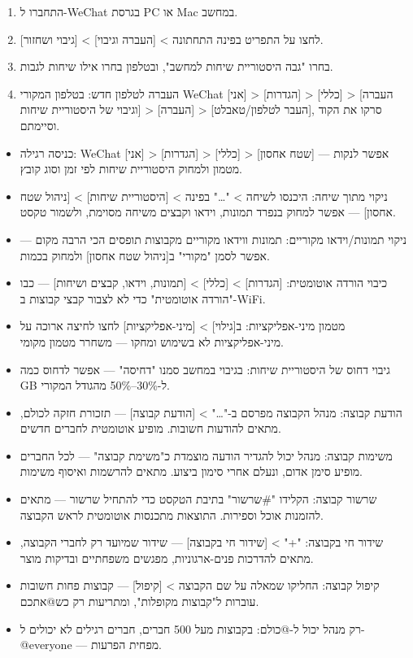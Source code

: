\begin{enumerate}
  \item התחברו ל-WeChat בגרסת PC או Mac במחשב.
  \item לחצו על התפריט בפינה התחתונה > [העברה וגיבוי] > [גיבוי ושחזור].
  \item בחרו "גבה היסטוריית שיחות למחשב", ובטלפון בחרו אילו שיחות לגבות.
  \item העברה לטלפון חדש: בטלפון המקורי WeChat [אני] > [הגדרות] > [כללי] > [העברה וגיבוי של היסטוריית שיחות] > [העברה] > [העבר לטלפון/טאבלט], סרקו את הקוד וסיימתם.
\end{enumerate}


\begin{itemize}
  \item כניסה רגילה: WeChat [אני] > [הגדרות] > [כללי] > [שטח אחסון] — אפשר לנקות מטמון ולמחוק היסטוריית שיחות לפי זמן וסוג קובץ.
  \item ניקוי מתוך שיחה: היכנסו לשיחה > "…" בפינה > [היסטוריית שיחות] > [ניהול שטח אחסון] — אפשר למחוק בנפרד תמונות, וידאו וקבצים משיחה מסוימת, ולשמור טקסט.
  \item ניקוי תמונות/וידאו מקוריים: תמונות ווידאו מקוריים מקבוצות תופסים הכי הרבה מקום — אפשר לסמן "מקורי" ב[ניהול שטח אחסון] ולמחוק בכמות.
  \item כיבוי הורדה אוטומטית: [הגדרות] > [כללי] > [תמונות, וידאו, קבצים ושיחות] — כבו "הורדה אוטומטית" כדי לא לצבור קבצי קבוצות ב-WiFi.
  \item מטמון מיני-אפליקציות: ב[גילוי] > [מיני-אפליקציות] לחצו לחיצה ארוכה על מיני-אפליקציות לא בשימוש ומחקו — משחרר מטמון מקומי.
  \item גיבוי דחוס של היסטוריית שיחות: בגיבוי במחשב סמנו "דחיסה" — אפשר לדחוס כמה GB ל-30\%–50\% מהגודל המקורי.
\end{itemize}


\begin{itemize}
  \item הודעת קבוצה: מנהל הקבוצה מפרסם ב-"…" > [הודעת קבוצה] — תזכורת חזקה לכולם, מתאים להודעות חשובות. מופיע אוטומטית לחברים חדשים.
  \item משימות קבוצה: מנהל יכול להגדיר הודעה מוצמדת כ"משימת קבוצה" — לכל החברים מופיע סימן אדום, ונעלם אחרי סימון ביצוע. מתאים להרשמות ואיסוף משימות.
  \item שרשור קבוצה: הקלידו "\#שרשור" בתיבת הטקסט כדי להתחיל שרשור — מתאים להזמנות אוכל וספירות. התוצאות מתכנסות אוטומטית לראש הקבוצה.
  \item שידור חי בקבוצה: "+" > [שידור חי בקבוצה] — שידור שמיועד רק לחברי הקבוצה, מתאים להדרכות פנים-ארגוניות, מפגשים משפחתיים ובדיקות מוצר.
  \item קיפול קבוצה: החליקו שמאלה על שם הקבוצה > [קיפול] — קבוצות פחות חשובות עוברות ל"קבוצות מקופלות", ומתריעות רק כש@אתכם.
  \item רק מנהל יכול ל-@כולם: בקבוצות מעל 500 חברים, חברים רגילים לא יכולים ל-@everyone — מפחית הפרעות.
\end{itemize}

